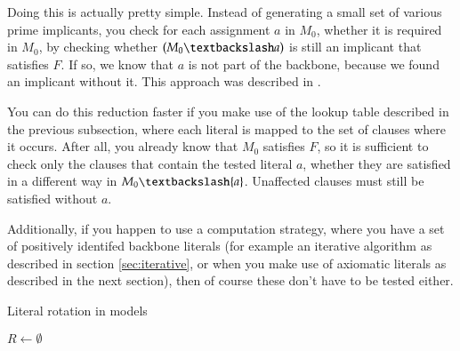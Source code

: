 Doing this is actually pretty simple. Instead of generating a small set of various prime implicants, you check for each assignment $a$ in $M_0$, whether it is required in $M_0$, by checking whether $(M_0 \textbackslash a)$ is still an implicant that satisfies $F$. If so, we know that $a$ is not part of the backbone, because we found an implicant without it. This approach was described in \cite{mjl15}.

You can do this reduction faster if you make use of the lookup table described in the previous subsection, where each literal is mapped to the set of clauses where it occurs. After all, you already know that $M_0$ satisfies $F$, so it is sufficient to check only the clauses that contain the tested literal $a$, whether they are satisfied in a different way in $M_0 \textbackslash \{a\}$. Unaffected clauses must still be satisfied without $a$.

Additionally, if you happen to use a computation strategy, where you have a set of positively identifed backbone literals (for example an iterative algorithm as described in section \ref{sec:iterative}, or when you make use of axiomatic literals as described in the next section), then of course these don't have to be tested either.



\begin{algorithm}
\caption{{\sc Literal rotation in models }}
\DontPrintSemicolon
{}
$R \gets \emptyset$\;
\;

\end{algorithm}


